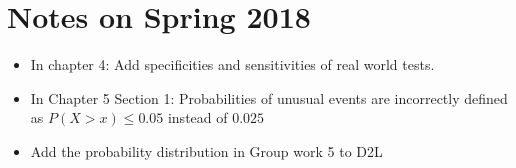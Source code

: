\documentclass{article}
\begin{document}
\section{Notes on Spring 2018}

\begin{itemize}
\item In chapter 4: Add specificities and sensitivities of real world tests.

\item In Chapter 5 Section 1: Probabilities of unusual events are incorrectly defined as $P(X > x) \le 0.05$ instead of $0.025$

\item Add the probability distribution in Group work 5 to D2L

\end{itemize}
\end{document}

